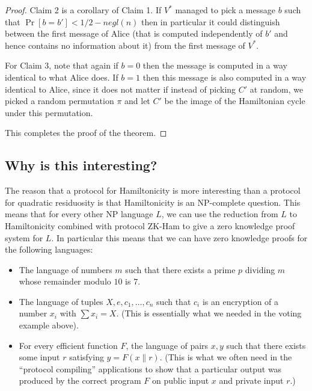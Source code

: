 \begin{proof}
Claim 2 is a corollary of Claim 1. If \(V^*\) managed to pick a message
\(b\) such that \(\Pr[ b=b' ] < 1/2 - negl(n)\) then in particular it
could distinguish between the first message of Alice (that is computed
independently of \(b'\) and hence contains no information about it) from
the first message of \(V^*\).

For Claim 3, note that again if \(b=0\) then the message is computed in
a way identical to what Alice does. If \(b=1\) then this message is also
computed in a way identical to Alice, since it does not matter if
instead of picking \(C'\) at random, we picked a random permutation
\(\pi\) and let \(C'\) be the image of the Hamiltonian cycle under this
permutation.

This completes the proof of the theorem.

\end{proof}

\subsection{Why is this interesting?}\label{Why-is-this-interesting}

The reason that a protocol for Hamiltonicity is more interesting than a
protocol for quadratic residuosity is that Hamiltonicity is an
NP-complete question. This means that for every other NP language \(L\),
we can use the reduction from \(L\) to Hamiltonicity combined with
protocol ZK-Ham to give a zero knowledge proof system for \(L\). In
particular this means that we can have zero knowledge proofs for the
following languages:

\begin{itemize}
\item
  The language of numbers \(m\) such that there exists a prime \(p\)
  dividing \(m\) whose remainder modulo \(10\) is \(7\).
\item
  The language of tuples \(X,e,c_1,\ldots,c_n\) such that \(c_i\) is an
  encryption of a number \(x_i\) with \(\sum x_i = X\). (This is
  essentially what we needed in the voting example above).
\item
  For every efficient function \(F\), the language of pairs \(x,y\) such
  that there exists some input \(r\) satisfying \(y=F(x\|r)\). (This is
  what we often need in the ``protocol compiling'' applications to show
  that a particular output was produced by the correct program \(F\) on
  public input \(x\) and private input \(r\).)
\end{itemize}


